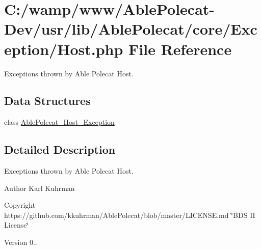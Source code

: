 \hypertarget{_exception_2_host_8php}{}\section{C\+:/wamp/www/\+Able\+Polecat-\/\+Dev/usr/lib/\+Able\+Polecat/core/\+Exception/\+Host.php File Reference}
\label{_exception_2_host_8php}


Exceptions thrown by Able Polecat Host.  


\subsection*{Data Structures}
\begin{DoxyCompactItemize}
\item 
class \hyperlink{class_able_polecat___host___exception}{Able\+Polecat\+\_\+\+Host\+\_\+\+Exception}
\end{DoxyCompactItemize}


\subsection{Detailed Description}
Exceptions thrown by Able Polecat Host. 

\begin{DoxyAuthor}{Author}
Karl Kuhrman 
\end{DoxyAuthor}
\begin{DoxyCopyright}{Copyright}
https\+://github.com/kkuhrman/\+Able\+Polecat/blob/master/\+L\+I\+C\+E\+N\+S\+E.\+md \char`\"{}\+B\+D\+S I\+I License\char`\"{} 
\end{DoxyCopyright}
\begin{DoxyVersion}{Version}
0.. 
\end{DoxyVersion}
